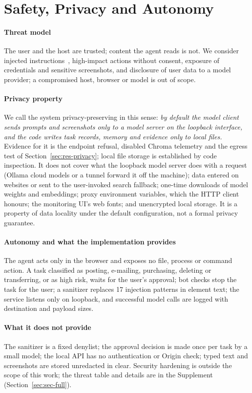 \section{Safety, Privacy and Autonomy}
\label{sec:safety}

\paragraph{Threat model} The user and the host are trusted; content the agent reads is not. We consider injected instructions~\cite{greshake2023indirect}, high-impact actions without consent, exposure of credentials and sensitive screenshots, and disclosure of user data to a model provider; a compromised host, browser or model is out of scope.

\paragraph{Privacy property} We call the system privacy-preserving in this sense: \emph{by default the model client sends prompts and screenshots only to a model server on the loopback interface, and the code writes task records, memory and evidence only to local files.} Evidence for it is the endpoint refusal, disabled Chroma telemetry and the egress test of Section~\ref{sec:res-privacy}; local file storage is established by code inspection. It does not cover what the loopback model server does with a request (Ollama cloud models or a tunnel forward it off the machine); data entered on websites or sent to the user-invoked search fallback; one-time downloads of model weights and embeddings; proxy environment variables, which the HTTP client honours; the monitoring UI's web fonts; and unencrypted local storage. It is a property of data locality under the default configuration, not a formal privacy guarantee.




\paragraph{Autonomy and what the implementation provides} The agent acts only in the browser and exposes no file, process or command action. A task classified as posting, e-mailing, purchasing, deleting or transferring, or as high risk, waits for the user's approval; bot checks stop the task for the user; a sanitizer replaces 17 injection patterns in element text; the service listens only on loopback, and successful model calls are logged with destination and payload sizes.

\paragraph{What it does not provide} The sanitizer is a fixed denylist; the approval decision is made once per task by a small model; the local API has no authentication or Origin check; typed text and screenshots are stored unredacted in clear. Security hardening is outside the scope of this work; the threat table and details are in the Supplement (Section~\ref{sec:sec-full}).
